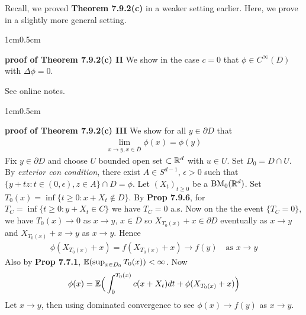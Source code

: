 \documentclass[12pt,a4paper]{report}
\newenvironment{proof}
{\begin{changemargin}{1cm}{0.5cm} 
	}%
	{\end{changemargin}
}
\begin{document}
Recall, we proved \textbf{Theorem 7.9.2(c)} in a weaker setting earlier. Here, we prove in a slightly more general setting.
\begin{proof}
\textbf{proof of Theorem 7.9.2(c) II} We show in the case $c=0$ that $\phi \in C^{\infty}(D)$ with $\Delta \phi =0$.

See online notes.
\end{proof}
\s

\begin{proof}
\textbf{proof of Theorem 7.9.2(c) III} We show for all $y \in \partial D$ that
\begin{align*}
\lim_{x\rightarrow y, x\in \overline{D}} \phi(x) = \phi(y)
\end{align*}
Fix $y\in \partial D$ and choose $U$ bounded open set $\subset \mathbb{R}^d$ with $u\in U$. Set $D_0 = D \cap U$. By \emph{exterior con condition}, there exist $A\in S^{d-1}$, $\epsilon>0$ such that $\{y+tz : t \in (0,\epsilon) , z\in A \} \cap D = \phi$. Let $(X_t)_{t\geq 0}$ be a $\text{BM}_0(\mathbb{R}^d)$. Set $T_0(x) = \inf \{ t\geq 0: x+ X_t \not\in D \}$. By \textbf{Prop 7.9.6}, for $T_C = \inf \{t\geq 0 : y+X_t \in C \}$ we have $T_C =0$ a.s. Now on the the event $\{ T_C =0 \}$, we have $T_0(x) \rightarrow 0$ as $x\rightarrow y$, $x\in \overline{D}$ so $X_{T_0(x)} + x \in \partial D$ eventually as $x\rightarrow y$ and $X_{T_0(x)} +x \rightarrow y$ as $x\rightarrow y$. Hence
\begin{align*}
\phi(X_{T_0(x)} +x) = f(X_{T_0(x)} +x) \rightarrow f(y) \quad \text{as }x\rightarrow y
\end{align*}
Also by \textbf{Prop 7.7.1}, $\mathbb{E}(\sup_{x\in D_0} T_0(x)) < \infty$. Now
\begin{align*}
\phi(x) = \mathbb{E} \Big( \int_0^{T_0(x)} c(x+X_t)dt + \phi(X_{T_0(x)} + x) \Big)
\end{align*}
Let $x\rightarrow y$, then using dominated convergence to see $\phi(x) \rightarrow f(y)$ as $x\rightarrow y$.

\eop
\end{proof}
\end{document}
